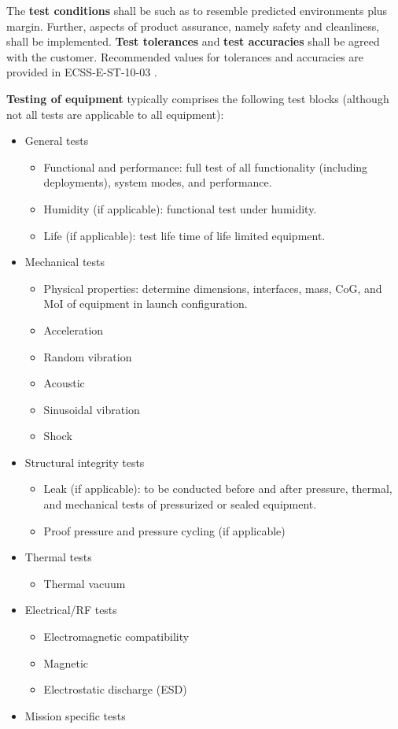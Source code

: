 The \textbf{test conditions} shall be such as to resemble predicted environments plus margin. Further, aspects of product assurance, namely safety and cleanliness, shall be implemented. \textbf{Test tolerances} and \textbf{ test accuracies} shall be agreed with the customer. Recommended values for tolerances and accuracies are provided in ECSS-E-ST-10-03 \cite{ECSS-E-ST-10-03}.

\textbf{Testing of equipment} typically comprises the following test blocks (although not all tests are applicable to all equipment):

\begin{itemize}
\item General tests
	\begin{itemize}
	\item Functional and performance: full test of all functionality (including deployments), system modes, and performance.
	\item Humidity (if applicable): functional test under humidity.
	\item Life (if applicable): test life time of life limited equipment.
	\end{itemize}
\item Mechanical tests
	\begin{itemize}
	\item Physical properties: determine dimensions, interfaces, mass, CoG, and MoI of equipment in launch configuration.
	\item Acceleration
	\item Random vibration
	\item Acoustic
	\item Sinusoidal vibration
	\item Shock
	\end{itemize}
\item Structural integrity tests
	\begin{itemize}
	\item Leak (if applicable): to be conducted before and after pressure, thermal, and mechanical tests of pressurized or sealed equipment.
	\item Proof pressure and pressure cycling (if applicable)
	\end{itemize}
\item Thermal tests
	\begin{itemize}
	\item Thermal vacuum
	\end{itemize}
\item Electrical/RF tests
	\begin{itemize}
	\item Electromagnetic compatibility
	\item Magnetic
	\item Electrostatic discharge (ESD)
	\end{itemize}
\item Mission specific tests
\end{itemize}

